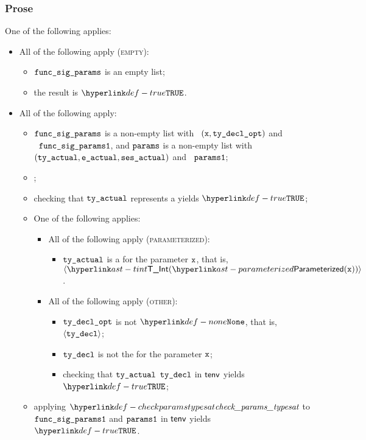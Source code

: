 \subsubsection{Prose}
One of the following applies:
\begin{itemize}
  \item All of the following apply (\textsc{empty}):
  \begin{itemize}
    \item $\texttt{func\_sig\_params}$ is an empty list;
    \item the result is $\True$.
  \end{itemize}

  \item All of the following apply:
  \begin{itemize}
    \item $\texttt{func\_sig\_params}$ is a non-empty list with \head\ $(\texttt{x}, \texttt{ty\_decl\_opt})$ and \\
          \tail\ $\texttt{func\_sig\_params1}$, and
          $\texttt{params}$ is a non-empty list with \head\ \\
          $(\texttt{ty\_actual}, \texttt{e\_actual}, \texttt{ses\_actual})$ and \tail\ $\texttt{params1}$;
    \item \Prosecheckstaticallyevaluable{$\vsesactual$};
    \item checking that $\texttt{ty\_actual}$ represents a \constrainedinteger{} yields $\True$\ProseOrTypeError;
    \item One of the following applies:
    \begin{itemize}
      \item All of the following apply (\textsc{parameterized}):
      \begin{itemize}
        \item $\texttt{ty\_actual}$ is a \parameterizedintegertype{} for the parameter $\texttt{x}$, that is, \\
              $\langle\TInt(\parameterized(\vx))\rangle$.
      \end{itemize}

      \item All of the following apply (\textsc{other}):
      \begin{itemize}
        \item $\texttt{ty\_decl\_opt}$ is not $\None$, that is, $\langle\texttt{ty\_decl}\rangle$;
        \item $\texttt{ty\_decl}$ is not the \parameterizedintegertype{} for the parameter $\texttt{x}$;
        \item checking that $\texttt{ty\_actual}$ \typesatisfies{} $\texttt{ty\_decl}$ in $\textsf{tenv}$ yields
              $\True$\ProseOrTypeError;
      \end{itemize}
    \end{itemize}
    \item applying $\checkparamstypesat$ to $\texttt{func\_sig\_params1}$ and $\texttt{params1}$ in $\textsf{tenv}$
          yields \\ $\True$\ProseOrTypeError.
  \end{itemize}
\end{itemize}


